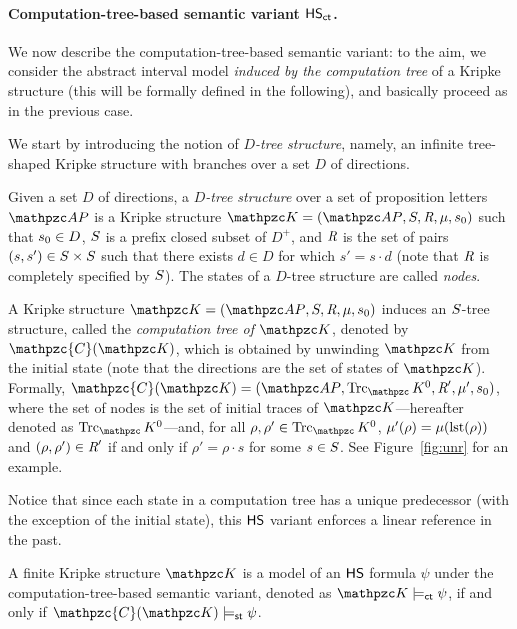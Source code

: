 \paragraph*{Computation-tree-based semantic variant $\text{\sffamily HS}_{\mathsf{ct}}$.}%
We now describe the com\-putation-tree-based semantic variant: to the aim, we consider the abstract interval model \emph{induced by the computation tree} of a Kripke structure (this will be formally defined in the following), and basically  proceed as in the previous case. 

We start by introducing the notion of \emph{$D$-tree structure}, namely, an infinite tree-shaped Kripke structure with branches over a set $D$ of directions.

\begin{definition} Given a set $D$ of directions,
a \emph{$D$-tree structure} over a set of proposition letters $\Prop$ is a Kripke structure $\Ku=\KuDef$
such that $s_0\in D$, $S$ is a prefix closed subset of $D^{+}$, and $\textit{R}$ is the set of pairs $(s,s')\in S\times S$ such that there exists $d\in D$
for which $s'=s\cdot d$ (note that $\textit{R}$ is completely specified by $S$). The states of a $D$-tree structure are called \emph{nodes}.
\end{definition}

A Kripke structure $\Ku=\KuDef$ induces an $S$-tree structure, called the \emph{computation tree of $\Ku$}, denoted by
$\mathpzc{C}(\Ku)$, which is obtained by unwinding $\Ku$ %
from the initial state (note that the directions are the set of states of $\Ku$).
Formally, $\mathpzc{C}(\Ku)= (\Prop,\Trk_\Ku^{0}, \Edges',\Lab',\sinit)$, where the set of nodes is the set of initial traces of
$\Ku$---hereafter denoted as $\Trk_\Ku^0$---and, for all $\rho,\rho'\in \Trk_\Ku^{0}$, $\mu'(\rho)=\mu(\operatorname{lst}(\rho))$ and $(\rho,\rho')\in \textit{R}'$ if and only if
$\rho'=\rho\cdot s$ for some $s\in S$.
See Figure~\ref{fig:unr} for an example.





Notice that since each state in a computation tree has a unique predecessor (with the exception of the initial state), this $\text{\sffamily HS}$ variant enforces a linear reference in the past.

\begin{definition}
A finite Kripke structure $\Ku$ is a model of an $\text{\sffamily HS}$ formula $\psi$ under the computation-tree-based semantic variant, denoted as $\Ku\models_\LinearPast \psi$, if and only if
$\mathpzc{C}(\Ku)\models_\stat \psi$.
\end{definition}

